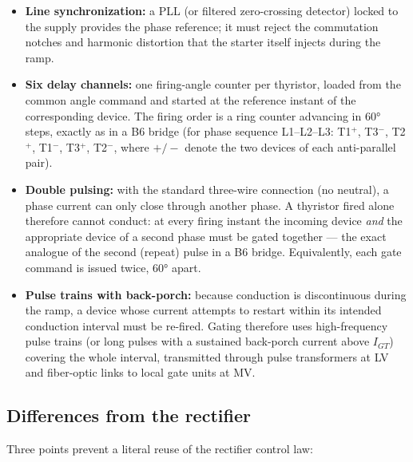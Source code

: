 \begin{itemize}
  \item \textbf{Line synchronization:} a PLL (or filtered zero-crossing
        detector) locked to the supply provides the phase reference; it must
        reject the commutation notches and harmonic distortion that the
        starter itself injects during the ramp.
  \item \textbf{Six delay channels:} one firing-angle counter per thyristor,
        loaded from the common angle command and started at the reference
        instant of the corresponding device. The firing order is a ring
        counter advancing in \ang{60} steps, exactly as in a B6 bridge
        (for phase sequence L1--L2--L3:
        T1$^{+}$, T3$^{-}$, T2$^{+}$, T1$^{-}$, T3$^{+}$, T2$^{-}$, where
        $+/-$ denote the two devices of each anti-parallel pair).
  \item \textbf{Double pulsing:} with the standard three-wire connection
        (no neutral), a phase current can only close through another phase.
        A thyristor fired alone therefore cannot conduct: at every firing
        instant the incoming device \emph{and} the appropriate device of a
        second phase must be gated together --- the exact analogue of the
        second (repeat) pulse in a B6 bridge. Equivalently, each gate
        command is issued twice, \ang{60} apart.
  \item \textbf{Pulse trains with back-porch:} because conduction is
        discontinuous during the ramp, a device whose current attempts to
        restart within its intended conduction interval must be re-fired.
        Gating therefore uses high-frequency pulse trains (or long pulses
        with a sustained back-porch current above $I_{GT}$) covering the
        whole interval, transmitted through pulse transformers at LV and
        fiber-optic links to local gate units at MV.
\end{itemize}

\subsection{Differences from the rectifier}

Three points prevent a literal reuse of the rectifier control law:

